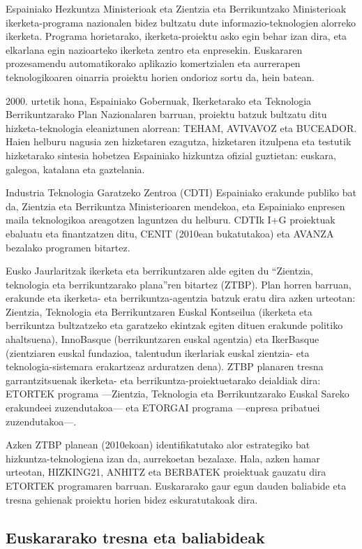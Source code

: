 \begin{multicols}{2}
Espainiako Hezkuntza Ministerioak eta Zientzia eta Berrikuntzako Ministerioak ikerketa-programa nazionalen bidez bultzatu dute informazio-teknologien alorreko ikerketa. Programa horietarako, ikerketa-proiektu asko egin behar izan dira, eta elkarlana egin nazioarteko ikerketa zentro eta  enpresekin. Euskararen prozesamendu automatikorako aplikazio komertzialen eta aurrerapen teknologikoaren oinarria proiektu horien ondorioz sortu da, hein batean.

2000. urtetik hona, Espainiako Gobernuak, Ikerketarako eta Teknologia Berrikuntzarako Plan Nazionalaren barruan, proiektu batzuk bultzatu ditu hizketa-teknologia eleaniztunen alorrean: TEHAM, AVIVAVOZ eta BUCEADOR. Haien helburu nagusia zen hizketaren ezagutza, hizketaren itzulpena eta testutik hizketarako sintesia hobetzea Espainiako hizkuntza ofizial guztietan: euskara, galegoa, katalana eta gaztelania.

Industria Teknologia Garatzeko Zentroa (CDTI) Espainiako erakunde publiko bat da, Zientzia eta Berrikuntza Ministerioaren mendekoa, eta Espainiako enpresen maila teknologikoa areagotzen laguntzea du helburu. CDTIk I+G proiektuak ebaluatu eta finantzatzen ditu, CENIT (2010ean bukatutakoa) eta AVANZA bezalako programen bitartez.

Eusko Jaurlaritzak ikerketa eta berrikuntzaren alde egiten du “Zientzia, teknologia eta berrikuntzarako plana”ren bitartez (ZTBP). Plan horren barruan, erakunde eta ikerketa- eta berrikuntza-agentzia batzuk eratu dira azken urteotan: Zientzia, Teknologia eta Berrikuntzaren Euskal Kontseilua (ikerketa eta berrikuntza bultzatzeko eta garatzeko ekintzak egiten dituen erakunde politiko ahaltsuena), InnoBasque (berrikuntzaren euskal agentzia) eta IkerBasque (zientziaren euskal fundazioa, talentudun ikerlariak euskal zientzia- eta teknologia-sistemara erakartzeaz arduratzen dena). ZTBP planaren tresna garrantzitsuenak ikerketa- eta berrikuntza-proiektuetarako deialdiak dira: ETORTEK programa —Zientzia, Teknologia eta Berrikuntzarako Euskal Sareko erakundeei zuzendutakoa— eta ETORGAI programa —enpresa pribatuei zuzendutakoa—. 

Azken ZTBP planean (2010ekoan) identifikatutako alor estrategiko bat hizkuntza-teknologiena izan da, aurrekoetan bezalaxe. Hala, azken hamar urteotan, HIZKING21, ANHITZ eta BERBATEK \cite{BAS-Nota37} proiektuak gauzatu dira ETORTEK programaren barruan. Euskararako gaur egun dauden baliabide eta tresna gehienak proiektu horien bidez eskuratutakoak dira.

\subsection{Euskararako tresna eta baliabideak}


\end{multicols}
